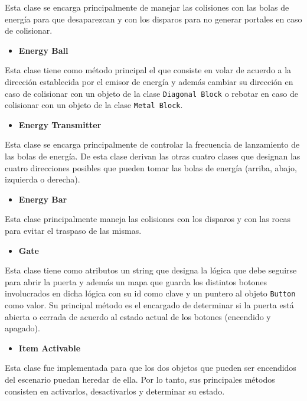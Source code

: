 \documentclass[a4paper]{article}
\begin{document}
Esta clase se encarga principalmente de manejar las colisiones con las bolas de energía para que desaparezcan y con los disparos para no generar portales en caso de colisionar.

\begin{itemize}
	\item \textbf{Energy Ball}
\end{itemize}

Esta clase tiene como método principal el que consiste en volar de acuerdo a la dirección establecida por el emisor de energía y además cambiar su dirección en caso de colisionar con un objeto de la clase \texttt{Diagonal Block} o rebotar en caso de colisionar con un objeto de la clase \texttt{Metal Block}.

\begin{itemize}
	\item \textbf{Energy Transmitter}
\end{itemize}

Esta clase se encarga principalmente de controlar la frecuencia de lanzamiento de las bolas de energía. De esta clase derivan las otras cuatro clases que designan las cuatro direcciones posibles que pueden tomar las bolas de energía (arriba, abajo, izquierda o derecha).

\begin{itemize}
	\item \textbf{Energy Bar}
\end{itemize}

Esta clase principalmente maneja las colisiones con los disparos y con las rocas para evitar el traspaso de las mismas.


\begin{itemize}
	\item \textbf{Gate}
\end{itemize}

Esta clase tiene como atributos un string que designa la lógica que debe seguirse para abrir la puerta y además un mapa que guarda los distintos botones involucrados en dicha lógica con su id como clave y un puntero al objeto \texttt{Button} como valor. Su principal método es el encargado de determinar si la puerta está abierta o cerrada de acuerdo al estado actual de los botones (encendido y apagado).

\begin{itemize}
	\item \textbf{Item Activable}
\end{itemize}

Esta clase fue implementada para que los dos objetos que pueden ser encendidos del escenario puedan heredar de ella. Por lo tanto, sus principales métodos consisten en activarlos, desactivarlos y determinar su estado.
\end{document}
